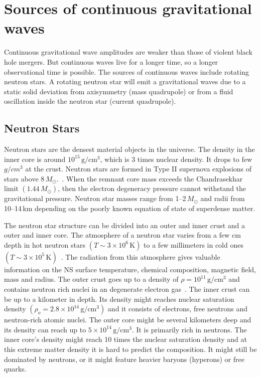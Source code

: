 \documentclass{ttuthes2007}
\begin{document}
\section{Sources of continuous gravitational waves}
Continuous gravitational wave amplitudes are weaker than those of violent black
hole mergers. But continuous waves live for a longer time, so a longer
observational time is possible. The sources of continuous waves include
rotating neutron stars. A
rotating neutron star will emit a gravitational waves due to a static solid deviation from
axisymmetry (mass quadrupole) or from a fluid oscillation inside the neutron
star (current quadrupole). 

\subsection{Neutron Stars}
Neutron stars are the densest material objects in the universe. The density in
the inner core is around $10^{15}$\,$\mathrm{g/cm^3}$,
which is 3 times nuclear density. It drops to few $g/cm^3$ at the crust. Neutron
stars
are formed in Type II supernova explosions of 
stars above $8\,M_\odot$.~\cite{Lattimer_2004}. When the remnant core
mass exceeds the Chandrasekhar limit $(1.44\,M_\odot)$, then the electron
degeneracy pressure cannot withstand the gravitational pressure. Neutron star
masses range from 1--2\,$M_\odot$ and radii from 10--14\,km depending on
the poorly known equation of state of superdense matter. 
	
The neutron star structure can be divided into an outer and inner crust and a
outer and inner
core. The atmosphere of a neutron star varies
from a few cm depth in hot neutron stars $(T\sim3\times10^6\,\mathrm{K})$ to a few
millimeters in cold ones
$(T\sim3\times10^5\,\mathrm{K})$~\cite{Haensel:2007yy}. The radiation from this atmosphere gives valuable
information on the \ac{NS} surface temperature, chemical composition, magnetic
field, mass and radius. The outer crust goes up to a density of
$\rho=10^{11}\,\mathrm{g/cm^3}$ and contains neutron rich nuclei in an degenerate
electron gas~\cite{1976ApJ...208..550P}. The inner crust
can be up to a kilometer in depth. Its density might reaches nuclear saturation 
density $(\rho_o=2.8\times10^{14}\,\mathrm{g/cm^3})$ and it consists of
electrons, free neutrons and neutron-rich atomic nuclei. The outer core might be
several kilometers deep and its density can reach up to
$5\times10^{14}\,\mathrm{g/cm^3}$.
It is
primarily rich in neutrons. The inner core's density might reach 10 times the
nuclear saturation density and
at this extreme matter density it is hard to predict the composition. It might
still be dominated by neutrons, or it might feature heavier baryons (hyperons)
or free quarks. 
\end{document}
